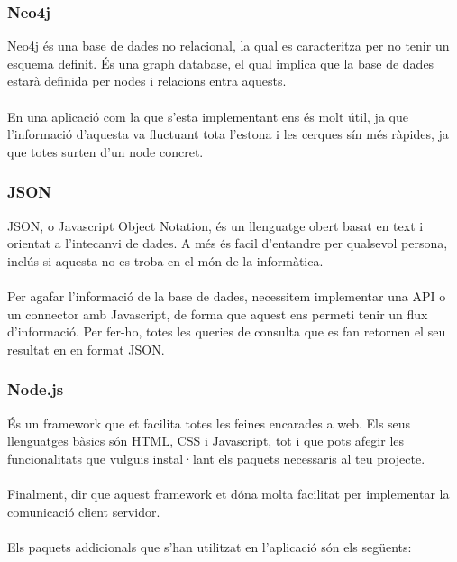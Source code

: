 \documentclass[11pt,catalan,listoffigures,listoftables]{tfgetsinf}
\begin{document}
\subsubsection{Neo4j}

Neo4j és una base de dades no relacional, la qual es caracteritza per no tenir un esquema definit. És una graph database, el qual implica que la base de dades estarà definida per nodes i relacions entra aquests.\\ \\
En una aplicació com la que s'esta implementant ens és molt útil, ja que l'informació d'aquesta va fluctuant tota l'estona i les cerques sín més ràpides, ja que totes surten d'un node concret.

\subsubsection{JSON}
JSON, o Javascript Object Notation, és un llenguatge obert basat en text i orientat a l'intecanvi de dades. A més és facil d'entandre per qualsevol persona, inclús si aquesta no es troba en el món de la informàtica.\\ \\
Per agafar l'informació de la base de dades, necessitem implementar una API o un connector amb Javascript, de forma que aquest ens permeti tenir un flux d'informació. Per fer-ho, totes les queries de consulta que es fan retornen el seu resultat en en format JSON.

\subsubsection{Node.js}

És un framework que et facilita totes les feines encarades a web. Els seus llenguatges bàsics són HTML, CSS i Javascript, tot i que pots afegir les funcionalitats que vulguis instal·lant els paquets necessaris al teu projecte.\\ \\
Finalment, dir que aquest framework et dóna molta facilitat per implementar la comunicació client servidor.\\ \\
Els paquets addicionals que s'han utilitzat en l'aplicació són els següents:
\end{document}
